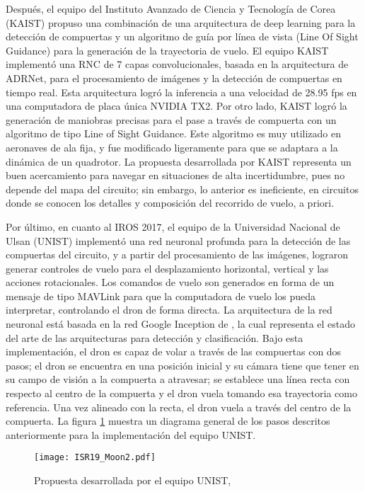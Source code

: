 Después, el equipo del Instituto Avanzado de Ciencia y Tecnología de Corea (KAIST) propuso una combinación de una arquitectura de deep learning para la detección de compuertas y un algoritmo de guía por línea de vista (Line Of Sight Guidance) para la generación de la trayectoria de vuelo.
 El equipo KAIST implementó una RNC de 7 capas convolucionales, basada en la arquitectura de ADRNet, para el procesamiento de imágenes y la detección de compuertas en tiempo real. Esta arquitectura logró la inferencia a una velocidad de 28.95 fps en una computadora de placa única NVIDIA TX2. 
Por otro lado, KAIST logró la generación de maniobras precisas para el pase a través de compuerta con un algoritmo de tipo Line of Sight Guidance. Este algoritmo es muy utilizado en aeronaves de ala fija, y fue modificado ligeramente para que se adaptara a la dinámica de un quadrotor.
La propuesta desarrollada por KAIST representa un buen acercamiento para navegar en situaciones de alta incertidumbre, pues no depende del mapa del circuito; sin embargo, lo anterior es ineficiente, en circuitos donde se conocen los detalles y composición del recorrido de vuelo, a priori.

Por último, en cuanto al IROS 2017, el equipo de la Universidad Nacional de Ulsan (UNIST) implementó una red neuronal profunda para la detección de las compuertas del circuito, y a partir del procesamiento de las imágenes, lograron generar controles de vuelo para el desplazamiento horizontal, vertical y las acciones rotacionales. Los comandos de vuelo son generados en forma de un mensaje de tipo MAVLink para que la computadora de vuelo los pueda interpretar, controlando el dron de forma directa.
La arquitectura de la red neuronal está basada en la red Google Inception de \citet{xia2017inception}, la cual representa el estado del arte de las arquitecturas para detección y clasificación. 
Bajo esta implementación, el dron es capaz de volar a través de las compuertas con dos pasos; el dron se encuentra en una posición inicial y su cámara tiene que tener en su campo de visión a la compuerta a atravesar; se establece una línea recta con respecto al centro de la compuerta y el dron vuela tomando esa trayectoria como referencia. Una vez alineado con la recta, el dron vuela a través del centro de la compuerta. La figura \ref{fig:ISR19_Moon2} muestra un diagrama general de los pasos descritos anteriormente para la implementación del equipo UNIST.

\begin{figure}[ht]
    \centering
    \texttt{[image: ISR19\_Moon2.pdf]}
    \caption{Propuesta desarrollada por el equipo UNIST, \citet{moon2017iros}}
    \label{fig:ISR19_Moon2}
\end{figure}


